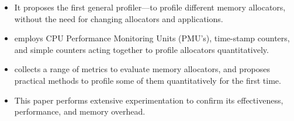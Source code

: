 \begin{itemize}
\item It proposes the first general profiler--\MP{}--to profile different memory allocators, without the need for changing allocators and applications.  

\item \MP{} employs CPU Performance Monitoring Units (PMU's), time-stamp counters, and simple counters acting together to profile allocators quantitatively. 

\item \MP{} collects a range of metrics to evaluate memory allocators, and proposes practical methods to profile some of them quantitatively for the first time. 
 
\item This paper performs extensive experimentation to confirm its effectiveness, performance, and memory overhead.    

\end{itemize} 


